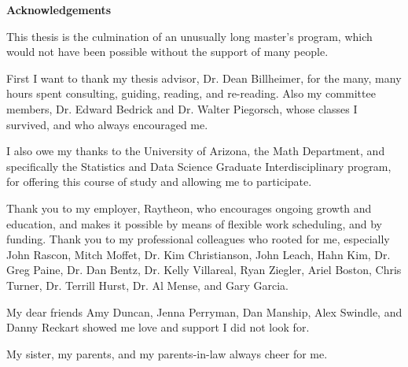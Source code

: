 \documentclass[12pt, a4paper]{article}
\begin{document}


% 



\noindent\begin{huge}\textbf{Acknowledgements}\end{huge}

\vspace{2cm}

\noindent This thesis is the culmination of an unusually long master’s program, which would not have been possible without the support of many people.

\vspace{1cm}

\noindent First I want to thank my thesis advisor, Dr. Dean Billheimer, for the many, many hours spent consulting, guiding, reading, and re-reading.  Also my committee members, Dr. Edward Bedrick and Dr. Walter Piegorsch, whose classes I survived, and who always encouraged me.

\vspace{1cm}

\noindent I also owe my thanks to the University of Arizona, the Math Department, and specifically the Statistics and Data Science Graduate Interdisciplinary program, for offering this course of study and allowing me to participate.

\vspace{1cm}

\noindent Thank you to my employer, Raytheon, who encourages ongoing growth and education, and makes it possible by means of flexible work scheduling, and by funding.  Thank you to my professional colleagues who rooted for me, especially John Rascon, Mitch Moffet, Dr. Kim Christianson, John Leach, Hahn Kim, Dr. Greg Paine, Dr. Dan Bentz, Dr. Kelly Villareal, Ryan Ziegler, Ariel Boston, Chris Turner, Dr. Terrill Hurst, Dr. Al Mense, and Gary Garcia.

\vspace{1cm}

\noindent My dear friends Amy Duncan, Jenna Perryman, Dan Manship, Alex Swindle, and Danny Reckart showed me love and support I did not look for.

\vspace{1cm}

\noindent My sister, my parents, and my parents-in-law always cheer for me.

\vspace{1cm}
\end{document}
